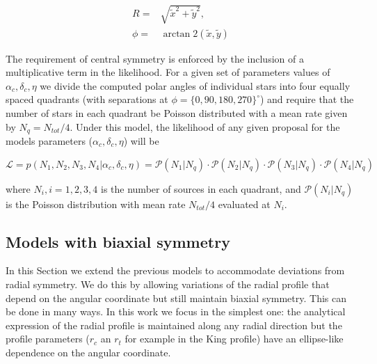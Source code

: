 \begin{align}
R=& \sqrt{\tilde{x}^2 + \tilde{y}^2},\nonumber\\
\phi=& \arctan2 (\tilde{x},\tilde{y})
\end{align}
 


The requirement of central symmetry is enforced by the inclusion of a multiplicative term in the likelihood. For a given set of parameters values of $\alpha_c, \delta_c, \eta$ we divide the computed polar angles of individual stars into four equally spaced quadrants (with separations at $\phi=\{0,90,180,270\}^{\circ}$) and require that the number of stars in each quadrant be Poisson distributed with a mean rate given by $N_q=N_{tot}/4$. Under this model, the likelihood of any given proposal for the models parameters ($\alpha_c,\delta_c,\eta$) will be

\begin{equation}
\mathcal{L}= p(N_1,N_2,N_3,N_4|\alpha_c,\delta_c,\eta) =\mathcal{P}(N_1|N_q)\cdot \mathcal{P}(N_2|N_q)\cdot \mathcal{P}(N_3|N_q)\cdot
\mathcal{P}(N_4|N_q) 
\end{equation}

where $N_i, i=1,2,3,4$ is the number of sources in each quadrant, and $\mathcal{P}(N_i|N_q)$ is the Poisson distribution with mean rate $N_{tot}/4$ evaluated at $N_i$.

%
%

\subsection{Models with biaxial symmetry}
\label{sect:EllipticModels}

In this Section we extend the previous models to accommodate deviations from radial symmetry. We do this by allowing variations of the radial profile that depend on the angular coordinate but still maintain biaxial symmetry. This can be done in many ways. In this work we focus in the simplest one: the analytical expression of the radial profile is maintained along any radial direction but the profile parameters ($r_c$ an $r_t$ for example in the King profile) have an ellipse-like dependence on the angular coordinate.

